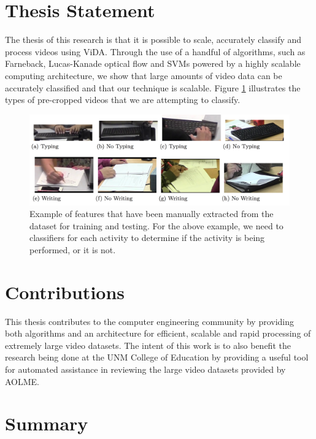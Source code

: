 \section{\label{section:thesis_statement}Thesis Statement}
The thesis of this research is that it is possible to scale, accurately
classify and process videos using ViDA. Through the use of a handful of algorithms,
such as Farneback, Lucas-Kanade optical flow and SVMs powered by a highly scalable
computing architecture, we show that large amounts of video data can be
accurately classified and that our technique is scalable. Figure \ref{fig:typing_writing}
illustrates the types of pre-cropped videos that we are attempting to classify.

\begin{figure}[h]
  \label{fig:typing_writing}
  \centering
  \includegraphics[width=\textwidth]{figures/typing_writing_clip}
  \caption{Example of features that have been manually extracted from the dataset
  for training and testing. For the above example, we need to classifiers for each
  activity to determine if the activity is being performed, or it is not.}
\end{figure}

\section{\label{section:contributions}Contributions}
This thesis contributes to the computer engineering community by providing both
algorithms and an architecture for efficient, scalable and rapid processing of
extremely large video datasets. The intent of this work is to also benefit
the research being done at the UNM College of Education by providing a useful
tool for automated assistance in reviewing the large video datasets provided
by AOLME.

\section{\label{section:summary}Summary}
